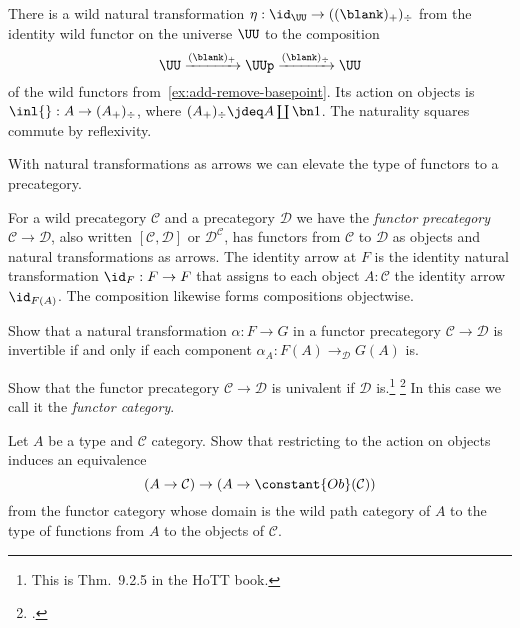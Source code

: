 \begin{example}
  There is a wild
  natural transformation $\eta : \id_{\UU} \to ((\blank)_+)_\div$
  from the identity wild functor on the universe $\UU$
  to the composition
  \[
    \UU \xrightarrow{(\blank)_+} \UUp \xrightarrow{(\blank)_\div} \UU
  \]
  of the wild functors from~\cref{ex:add-remove-basepoint}.
  Its action on objects is $\inl{} : A \to (A_+)_\div$,
  where $(A_+)_\div \jdeq A \coprod\bn 1$.
  The naturality squares commute by reflexivity.
\end{example}

With natural transformations as arrows we can elevate the
type of functors to a precategory.
\begin{definition}
  For a wild precategory $\mathcal C$ and a precategory $\mathcal D$
  we have the \emph{functor precategory}%
  $\mathcal C \to \mathcal D$, also written
  $[\mathcal C,\mathcal D]$ or $\mathcal D^{\mathcal C}$, %
  has functors from $\mathcal C$ to $\mathcal D$ as objects
  and natural transformations as arrows.
  The identity arrow at $F$ is the identity natural transformation
  $\id_F: F \to F$ that assigns to each object $A:\mathcal C$ the identity
  arrow $\id_{F(A)}$.
  The composition likewise forms compositions objectwise.
\end{definition}
\begin{xca}
  Show that a natural transformation $\alpha : F \to G$
  in a functor precategory $\mathcal C\to\mathcal D$
  is invertible if and only if
  each component $\alpha_A : F(A) \to_{\mathcal D} G(A)$ is.
\end{xca}
\begin{xca}
  Show that the functor precategory $\mathcal C\to\mathcal D$
  is univalent if $\mathcal D$ is.\footnote{%
    This is Thm.~9.2.5 in the HoTT book\footnotemark{}.}%
  \footcitetext{hottbook}
  In this case we call it the \emph{functor category}.
\end{xca}
\begin{xca}
  Let $A$ be a type and $\mathcal C$ category.
  Show that restricting to the action on objects
  induces an equivalence
  \[
    (A \to \mathcal C) \to (A \to \constant{Ob}(\mathcal C))
  \]
  from the functor category whose domain is the wild path category of $A$
  to the type of functions from $A$ to the objects of $\mathcal C$.
\end{xca}

